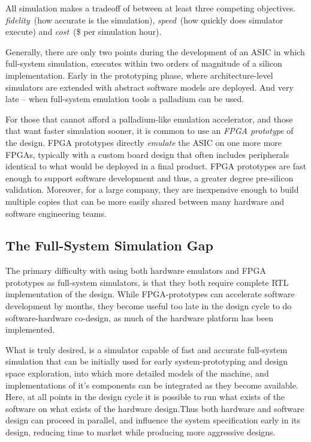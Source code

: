 All simulation makes a tradeoff of between at least three competing objectives.
\textit{fidelity}~(how accurate is the simulation), \textit{speed}~(how quickly
does simulator execute) and \textit{cost}~(\$ per simulation hour). 

Generally, there are only two points during the development of an ASIC in which
full-system simulation, executes within two orders of magnitude of a silicon
implementation. Early in the prototyping phase, where architecture-level
simulators are extended with abstract software models are deployed. And very
late -- when full-system emulation tools a palladium can be used.

For those that cannot afford a palladium-like emulation accelerator, and those
that want faster simulation sooner, it is common to use an \textit{FPGA
prototype} of the design. FPGA prototypes directly \textit{emulate} the ASIC on
one more more FPGAs, typically with a custom board design that often includes
peripherals identical to what would be deployed in a final product. FPGA
prototypes are fast enough to support software development and thus, a greater
degree pre-silicon validation. Moreover, for a large company, they are
inexpensive enough to build multiple copies that can be more easily shared
between many hardware and software engineering teams.

\subsection{The Full-System Simulation Gap}

The primary difficulty with using both hardware emulators and FPGA prototypes
as full-system simulators, is that they both require complete RTL
implementation of the design. While FPGA-prototypes can accelerate software
development by months, they become useful too late in the design cycle to do
software-hardware co-design, as much of the hardware platform has been
implemented.

What is truly desired, is a simulator capable of fast and accurate full-system
simulation that can be initially used for early system-prototyping and design
space exploration, into which more detailed models of the machine, and
implementations of it's components can be integrated as they become available.
Here, at all points in the design cycle it is possible to run what exists of
the software on what exists of the hardware design.Thus both hardware and
software design can proceed in parallel, and influence the system specification
early in its design, reducing time to market while producing more aggressive
designs.

